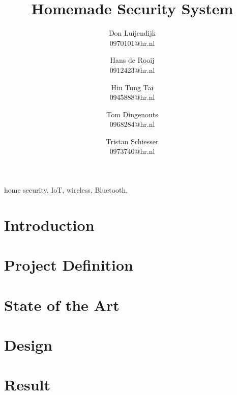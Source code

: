 \documentclass[conference]{IEEEtran}
\title{Homemade Security System}
\author{
	Don Luijendijk\\
	0970101@hr.nl
	\and 
	Hans de Rooij\\
	0912423@hr.nl
	\and 
	Hiu Tung Tai	\\
	0945888@hr.nl
	\and 
	Tom Dingenouts\\
	0968284@hr.nl
	\and 
	Tristan Schiesser\\
	0973740@hr.nl
}
\begin{document}
	\maketitle
	
	
	
	\begin{IEEEkeywords}
	home security, IoT, wireless, Bluetooth, 
	\end{IEEEkeywords}
	
	\section{Introduction}
	
	
	\section{Project Definition}
	
	
	\section{State of the Art}
	
	
	\section{Design}
	
	
	\section{Result}
	
	
	
		
		
\end{document}
